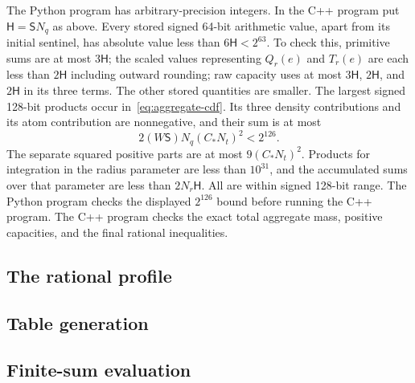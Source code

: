 \documentclass[11pt]{article}
\numberwithin{equation}{section}
\theoremstyle{definition}
\begin{document}
The Python program has arbitrary-precision integers.
In the C++ program put $\mathsf H=\mathsf S N_q$ as above.
Every stored signed 64-bit arithmetic value, apart from its initial
sentinel, has absolute value less than
$6\mathsf H<2^{63}$. To check this, primitive sums are at most
$3\mathsf H$; the scaled values representing $Q_r(e)$ and $T_r(e)$ are each less than
$2\mathsf H$ including outward rounding; raw capacity uses at most
$3\mathsf H$, $2\mathsf H$, and $2\mathsf H$ in its three terms.
The other stored quantities are smaller.
The largest signed 128-bit products occur in~\eqref{eq:aggregate-cdf}.
Its three density contributions and its atom contribution are
nonnegative, and their sum is at most
\[
 2(W\mathsf S)N_q(C_*N_t)^2<2^{126}.
\]
The separate squared positive parts are at most $9(C_*N_t)^2$.
Products for integration in the radius parameter are less than $10^{31}$,
and the accumulated sums over that parameter are less than $2N_r\mathsf H$.
All are within signed 128-bit range. The Python program checks the
displayed $2^{126}$ bound before running the C++ program.
The C++ program checks the exact total aggregate mass, positive
capacities, and the final rational inequalities.

\subsection{The rational profile}\label{app:profile}



\subsection{Table generation}\label{app:python}



\subsection{Finite-sum evaluation}\label{app:cpp}


\end{document}
